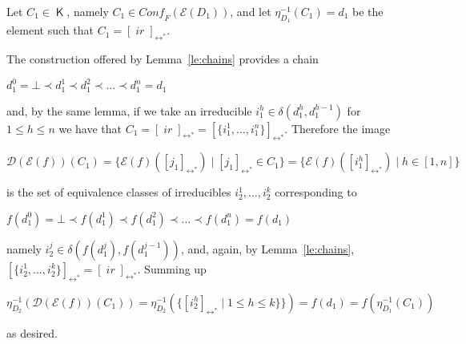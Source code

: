 \documentclass[conference]{IEEEtran}
\renewenvironment{proof}{\begin{IEEEproof}}{\end{IEEEproof}}
\newcommand{\compact}[1]{\ensuremath{\mathop{\mathsf{K}({#1})}}}
\newcommand{\ir}[1]{\ensuremath{\mathop{\mathit{ir}({#1})}}}
\newcommand{\diff}[2]{\ensuremath{\delta({#1},{#2})}}
\newcommand{\eqclass}[2][]{\ensuremath{[{#2}]_{\scriptscriptstyle {#1}}}}
\newcommand{\eqclassir}[1]{\ensuremath{\eqclass[\leftrightarrow^*]{#1}}}
\newcommand{\zev}[0]{\ensuremath{\mathcal{E}}}
\newcommand{\ev}[1]{\ensuremath{\zev({#1})}}
\newcommand{\conff}[1]{\ensuremath{\mathit{Conf_F}({#1})}}
\newcommand{\zdom}[0]{\ensuremath{\mathcal{D}}}
\newcommand{\dom}[1]{\ensuremath{\zdom({#1})}}
\newcommand{\interval}[2][1]{\ensuremath{[{#1},{#2}]}}
\begin{document}
\begin{proof}
  Let $C_1 \in \compact{\dom{\ev{D_1}}}$, namely
  $C_1 \in \conff{\ev{D_1}}$, and let $\eta_{D_1}^{-1}(C_1) = d_1$ be the
  element such that $C_1 = \eqclassir{\ir{d_1}}$.

  The construction offered by Lemma~\ref{le:chains} provides a chain
  \begin{center}
    ${d^0_1} = \bot \prec d_1^1 \prec d_1^2 \prec \ldots \prec d_1^n = d_1$
  \end{center}
  and, by the same lemma, if we take an irreducible $i_1^h \in
  \diff{d_1^h}{d_1^{h-1}}$ for $1 \leq h \leq n$ we have that
  $C_1 = \eqclassir{\ir{d_1}} = \eqclassir{\{i_1^1, \ldots, i_1^n \}}$.
  Therefore the image
  \begin{center}
    $\dom{\ev{f}}(C_1) = \{ \ev{f}(\eqclassir{j_1}) \mid
    \eqclassir{j_1} \in C_1 \} = \{ \ev{f}(\eqclassir{i_1^h}) \mid h
    \in \interval{n}\}$
  \end{center}
  is the set of equivalence classes of irreducibles
  $i_2^1, \ldots, i_2^k$ corresponding to 
  \begin{center}
    $f(d_1^0) = \bot \prec f(d_1^1) \prec f(d_1^2) \prec \ldots \prec
    f(d_1^n) = f(d_1)$
  \end{center}
  namely $i_2^j \in \diff{f(d_1^j)}{f(d_1^{j-1})}$, and,
  again, by Lemma~\ref{le:chains},
  $\eqclassir{\{i_2^1, \ldots, i_2^k\}} = \eqclassir{\ir{f(d_1)}}$.
  Summing up
  \begin{center}
    $\eta_{D_2}^{-1}(\dom{\ev{f}}(C_1)) = \eta_{D_2}^{-1}(\{ \eqclassir{i_2^h}
    \mid 1 \leq h \leq k \} \}) = f(d_1) = f(\eta_{D_1}^{-1}(C_1))$
  \end{center}
  as desired.



\end{proof}
\end{document}
